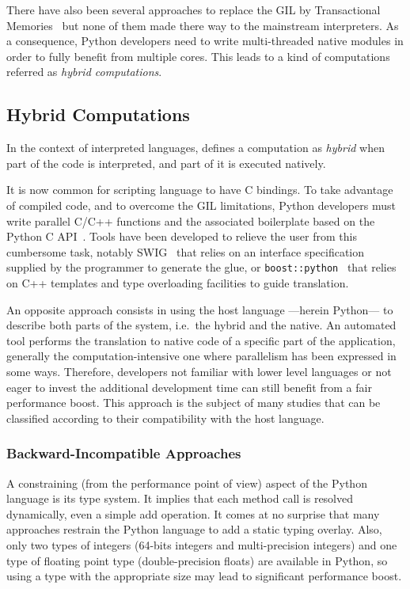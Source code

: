 \documentclass[conference]{IEEEtran}
\begin{document}
There have also been several approaches to replace the GIL by Transactional
Memories~\cite{Riley2006,Tabba2010} but none of them made there way to the
mainstream interpreters. As a consequence, Python developers need to write
multi-threaded native modules in order to fully benefit from multiple cores.
This leads to a kind of computations referred as \emph{hybrid computations}.


\subsection{Hybrid Computations}

In the context of interpreted languages, \cite{dongara2007} defines a 
computation as \emph{hybrid} when part of the code is interpreted, and part of
it is executed natively.

It is now common for scripting language to have C bindings. To take advantage of
compiled code, and to overcome the GIL limitations, Python developers must write
parallel C/C++ functions and the associated boilerplate based on the Python C
API~\cite{pythoncapi}. Tools have been developed to relieve the user from this
cumbersome task, notably SWIG~\cite{swig2003} that relies on an interface specification supplied by the programmer to generate the glue, or 
\texttt{boost::python}~\cite{boostpython2007} that relies on C++ templates and 
type overloading facilities to guide translation.

An opposite approach consists in using the host language ---herein Python--- to
describe both parts of the system, i.e.\ the hybrid and the native. An automated 
tool performs the translation to native code of a specific part of the 
application, generally the computation-intensive one where parallelism has been
expressed in some ways.
Therefore, developers not familiar with lower level languages or not eager to 
invest the additional development time can still benefit from a fair performance
boost.
This approach is the subject of many studies that can be classified according to
their compatibility with the host language.

\subsubsection{Backward-Incompatible Approaches}

A constraining (from the performance point of view) aspect of the Python
language is its type system. It implies that each method call is resolved
dynamically, even a simple add operation. It comes at no surprise that many
approaches restrain the Python language to add a static typing overlay.  Also,
only two types of integers (64-bits integers and multi-precision integers) and
one type of floating point type (double-precision floats) are available in
Python, so using a type with the appropriate size may lead to significant
performance boost.
\end{document}
